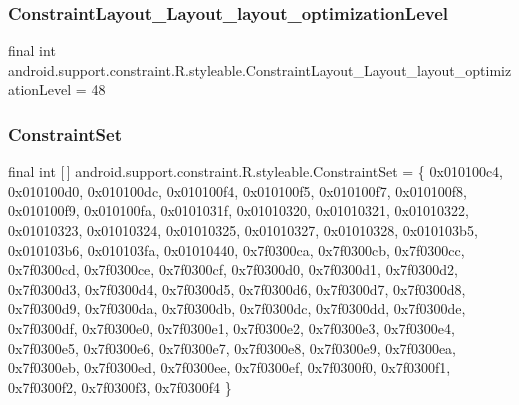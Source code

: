 \subsubsection{\texorpdfstring{Constraint\+Layout\+\_\+\+Layout\+\_\+layout\+\_\+optimization\+Level}{ConstraintLayout\_Layout\_layout\_optimizationLevel}}
{\footnotesize\ttfamily final int android.\+support.\+constraint.\+R.\+styleable.\+Constraint\+Layout\+\_\+\+Layout\+\_\+layout\+\_\+optimization\+Level = 48\hspace{0.3cm}{\ttfamily [static]}}

\mbox{\label{classandroid_1_1support_1_1constraint_1_1R_1_1styleable_aa16c37eee601191a12a97dcf9222a0b9}} 
\subsubsection{\texorpdfstring{Constraint\+Set}{ConstraintSet}}
{\footnotesize\ttfamily final int \mbox{[}$\,$\mbox{]} android.\+support.\+constraint.\+R.\+styleable.\+Constraint\+Set = \{ 0x010100c4, 0x010100d0, 0x010100dc, 0x010100f4, 0x010100f5, 0x010100f7, 0x010100f8, 0x010100f9, 0x010100fa, 0x0101031f, 0x01010320, 0x01010321, 0x01010322, 0x01010323, 0x01010324, 0x01010325, 0x01010327, 0x01010328, 0x010103b5, 0x010103b6, 0x010103fa, 0x01010440, 0x7f0300ca, 0x7f0300cb, 0x7f0300cc, 0x7f0300cd, 0x7f0300ce, 0x7f0300cf, 0x7f0300d0, 0x7f0300d1, 0x7f0300d2, 0x7f0300d3, 0x7f0300d4, 0x7f0300d5, 0x7f0300d6, 0x7f0300d7, 0x7f0300d8, 0x7f0300d9, 0x7f0300da, 0x7f0300db, 0x7f0300dc, 0x7f0300dd, 0x7f0300de, 0x7f0300df, 0x7f0300e0, 0x7f0300e1, 0x7f0300e2, 0x7f0300e3, 0x7f0300e4, 0x7f0300e5, 0x7f0300e6, 0x7f0300e7, 0x7f0300e8, 0x7f0300e9, 0x7f0300ea, 0x7f0300eb, 0x7f0300ed, 0x7f0300ee, 0x7f0300ef, 0x7f0300f0, 0x7f0300f1, 0x7f0300f2, 0x7f0300f3, 0x7f0300f4 \}\hspace{0.3cm}{\ttfamily [static]}}

\mbox{\label{classandroid_1_1support_1_1constraint_1_1R_1_1styleable_a8471fef09cf72eaaacf4d59a3438380c}} 
